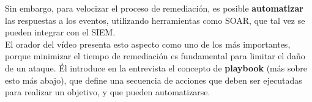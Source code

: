 Sin embargo, para velocizar el proceso de remediación, es posible \textbf{automatizar} las respuestas a los eventos, utilizando herramientas como \textsc{SOAR}, que tal vez se pueden integrar con el SIEM.\\
El orador del vídeo presenta esto aspecto como uno de los más importantes, porque minimizar el tiempo de remediación es fundamental para limitar el daño de un ataque.
Él introduce en la entrevista el concepto de \textbf{playbook} (más sobre esto más abajo), que define una secuencia de acciones que deben ser ejecutadas para realizar un objetivo, y que pueden automatizarse.








